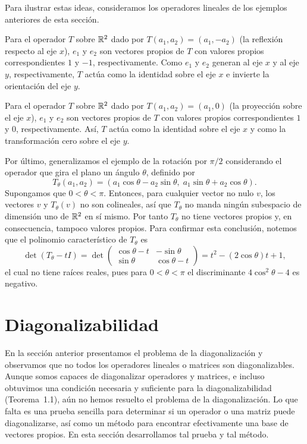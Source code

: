\documentclass[12pt,a4paper]{book}
\begin{document}
    Para ilustrar estas ideas, consideramos los operadores lineales de los ejemplos anteriores de esta sección.

    Para el operador $T$ sobre $\mathbb{R}^2$ dado por $T(a_1,a_2) = (a_1,-a_2)$ (la reflexión respecto al eje $x$), $e_1$ y $e_2$ son vectores propios de $T$ con valores propios correspondientes $1$ y $-1$, respectivamente. Como $e_1$ y $e_2$ generan al eje $x$ y al eje $y$, respectivamente, $T$ actúa como la identidad sobre el eje $x$ e invierte la orientación del eje $y$.

    Para el operador $T$ sobre $\mathbb{R}^2$ dado por $T(a_1,a_2)=(a_1,0)$ (la proyección sobre el eje $x$), $e_1$ y $e_2$ son vectores propios de $T$ con valores propios correspondientes $1$ y $0$, respectivamente. Así, $T$ actúa como la identidad sobre el eje $x$ y como la transformación cero sobre el eje $y$.

    Por último, generalizamos el ejemplo de la rotación por $\pi/2$ considerando el operador que gira el plano un ángulo $\theta$, definido por
    \begin{equation*}
        T_\theta(a_1,a_2) = (a_1\cos\theta - a_2\sin\theta,\; a_1\sin\theta + a_2\cos\theta).
    \end{equation*}
    Supongamos que $0 < \theta < \pi$. Entonces, para cualquier vector no nulo $v$, los vectores $v$ y $T_\theta(v)$ no son colineales, así que $T_\theta$ no manda ningún subespacio de dimensión uno de $\mathbb{R}^2$ en sí mismo. Por tanto $T_\theta$ no tiene vectores propios y, en consecuencia, tampoco valores propios. Para confirmar esta conclusión, notemos que el polinomio característico de $T_\theta$ es
    \begin{equation*}
        \det(T_\theta - tI) = \det\begin{pmatrix} \cos\theta - t & -\sin\theta \\ \sin\theta & \cos\theta - t\end{pmatrix} = t^2 - (2\cos\theta) t + 1,
    \end{equation*}
    el cual no tiene raíces reales, pues para $0 < \theta < \pi$ el discriminante $4\cos^2\theta - 4$ es negativo.

    \section{Diagonalizabilidad}

    En la sección anterior presentamos el problema de la diagonalización y observamos que no todos los operadores lineales o matrices son diagonalizables. Aunque somos capaces de diagonalizar operadores y matrices, e incluso obtuvimos una condición necesaria y suficiente para la diagonalizabilidad (Teorema~1.1), aún no hemos resuelto el problema de la diagonalización. Lo que falta es una prueba sencilla para determinar si un operador o una matriz puede diagonalizarse, así como un método para encontrar efectivamente una base de vectores propios. En esta sección desarrollamos tal prueba y tal método.
\end{document}
